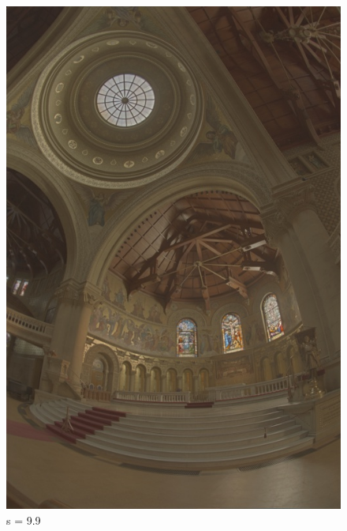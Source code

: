 \documentclass{article}
\begin{document}
\begin{figure}[!htb]
      \includegraphics[scale=.27]{./data/3/svar/s3.jpg}
      \caption{s = 9.9}
    \endminipage
    \end{figure}
    
\end{document}
